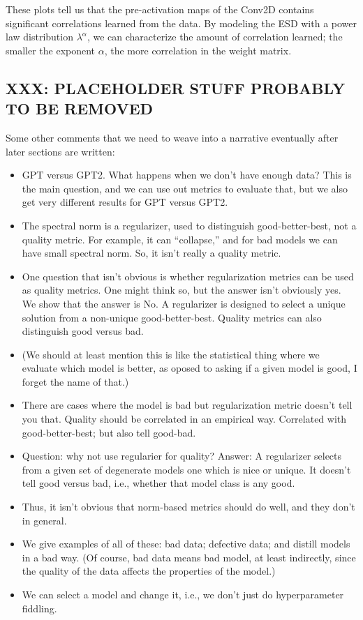 These plots tell us that the pre-activation maps of the Conv2D contains significant correlations learned from the data.  
By modeling the ESD with a power law distribution $\lambda^{\alpha}$, we can characterize the amount of correlation learned;
the smaller the exponent $\alpha$, the more correlation in the weight matrix. 

\subsection{XXX: PLACEHOLDER STUFF PROBABLY TO BE REMOVED}

Some other comments that we need to weave into a narrative eventually after later sections are written:
\begin{itemize}
\item
GPT versus GPT2.
What happens when we don't have enough data?
This is the main question, and we can use out metrics to evaluate that, but we also get very different results for GPT versus GPT2.
\item
The spectral norm is a regularizer, used to distinguish good-better-best, not a quality metric.
For example, it can ``collapse,'' and for bad models we can have small spectral norm.
So, it isn't really a quality metric.
\item
One question that isn't obvious is whether regularization metrics can be used as quality metrics.
One might think so, but the answer isn't obviously yes.
We show that the answer is No.
A regularizer is designed to select a unique solution from a non-unique good-better-best.
Quality metrics can also distinguish good versus bad.
\item
(We should at least mention this is like the statistical thing where we evaluate which model is better, as oposed to asking if a given model is good, I forget the name of that.)
\item
There are cases where the model is bad but regularization metric doesn't tell you that.
Quality should be correlated in an empirical way.
Correlated with good-better-best; but also tell good-bad.
\item
Question: why not use regularier for quality?
Answer: A regularizer selects from a given set of degenerate models one which is nice or unique.
It doesn't tell good versus bad, i.e., whether that model class is any good.
\item
Thus, it isn't obvious that norm-based metrics should do well, and they don't in general.
\item
We give examples of all of these: bad data; defective data; and distill models in a bad way.
(Of course, bad data means bad model, at least indirectly, since the quality of the data affects the properties of the model.)
\item
We can select a model and change it, i.e., we don't just do hyperparameter fiddling.
\end{itemize}

